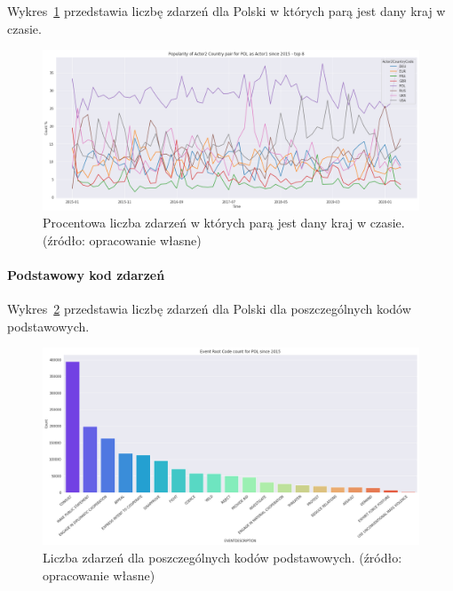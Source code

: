 \documentclass[11pt]{report}
\begin{document}
    Wykres~\ref{fig:PLpairPerc} przedstawia liczbę zdarzeń dla Polski w których parą jest dany kraj w czasie.
    \begin{figure}[!htp]
        \centering
        \includegraphics[width=1 \textwidth]{fig/PL/PLactor2PairPercinTIME.png}
        \caption{Procentowa liczba zdarzeń w których parą jest dany kraj w czasie. (źródło: opracowanie własne)}
        \label{fig:PLpairPerc}
    \end{figure}

    \paragraph{Podstawowy kod zdarzeń}

    Wykres~\ref{fig:PLPERC} przedstawia liczbę zdarzeń dla Polski dla poszczególnych kodów podstawowych.


    \begin{figure}[!htp]
        \centering
        \includegraphics[width=1 \textwidth]{fig/PL/PLERC.png}
        \caption{Liczba zdarzeń dla poszczególnych kodów podstawowych. (źródło: opracowanie własne)}
        \label{fig:PLPERC}
    \end{figure}
\end{document}
